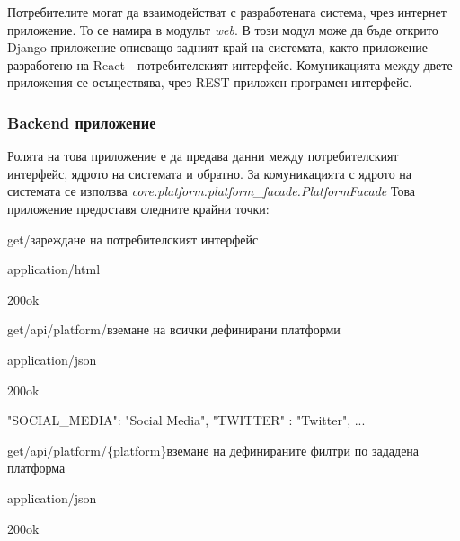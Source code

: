 \documentclass{article}
\begin{document}
Потребителите могат да взаимодействат с разработената система, чрез интернет приложение. То се намира в модулът
\textit{web}. В този модул може да бъде открито Django приложение описващо задният край на системата, както приложение
разработено на React - потребителският интерфейс. Комуникацията между двете приложения се осъществява, чрез REST
приложен програмен интерфейс.

\subsubsection{Backend приложение}

Ролята на това приложение е да предава данни между потребителският интерфейс, ядрото на системата и обратно. За
комуникацията с ядрото на системата се използва \textit{core.platform.platform\_facade.PlatformFacade} Това приложение
предоставя следните крайни точки:

\begin{apiRoute}{get}{/}{зареждане на потребителският интерфейс}
  \begin{routeResponse}{application/html}
    \begin{routeResponseItem}{200}{ok}
    \end{routeResponseItem}
  \end{routeResponse}
\end{apiRoute}

\begin{apiRoute}{get}{/api/platform/}{вземане на всички дефинирани платформи}
  \begin{routeResponse}{application/json}
    \begin{routeResponseItem}{200}{ok}
\begin{routeResponseItemBody}
{
  "SOCIAL_MEDIA": "Social Media",
  "TWITTER" : "Twitter",
  ...
}
\end{routeResponseItemBody}
    \end{routeResponseItem}
  \end{routeResponse}
\end{apiRoute}

\begin{apiRoute}{get}{/api/platform/\{platform\}}{вземане на дефинираните филтри по зададена платформа}
  \begin{routeParameter}
  \end{routeParameter}
  \begin{routeResponse}{application/json}
    \begin{routeResponseItem}{200}{ok}
\begin{routeResponseItemBody}
\end{routeResponseItemBody}
    \end{routeResponseItem}
  \end{routeResponse}
\end{apiRoute}
\end{document}

